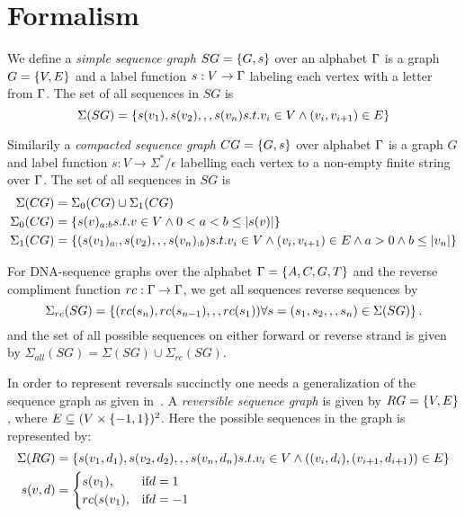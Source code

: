 \section{Formalism}
We define a \emph{simple sequence graph} $SG = \left\{G, s\right\}$ over an alphabet $\Gamma$ is a graph $G=\left\{V, E\right\}$ and a label function $s: V \rightarrow \Gamma$ labeling each vertex with a letter from $\Gamma$. The set of all sequences in $SG$ is 
$$\Sigma(SG) = \left\{s(v_1), s(v_2), , , s(v_n) s.t. v_i \in V \wedge (v_i, v_{i+1}) \in E\right\}$$

Similarily a \emph{compacted sequence graph} $CG = \left\{G, s\right\}$ over alphabet $\Gamma$ is a graph $G$ and label function $s: V \rightarrow \Sigma^* / \epsilon$ labelling each vertex to a non-empty finite string over $\Gamma$. The set of all sequences in $SG$ is
\begin{align*}
  \Sigma(CG) &= \Sigma_0(CG) \cup \Sigma_1(CG)\\
  \Sigma_0(CG) &=\left\{s(v)_{a:b} s.t. v \in V \wedge 0<a<b\leq\left|s(v)\right|\right\}\\
  \Sigma_1(CG) &= \left\{(s(v_1)_{a:}, s(v_2),,, s(v_n)_{:b}) s.t. v_i \in V \wedge (v_i, v_{i+1}) \in E \wedge a>0 \wedge b\leq \left|v_n\right|\right\}
\end{align*}

For DNA-sequence graphs over the alphabet $\Gamma=\left\{A, C, G, T\right\}$ and the reverse compliment function $rc: \Gamma \rightarrow \Gamma$, we get all sequences reverse sequences by
$$\Sigma_{rc}(SG) = \left\{(rc(s_n), rc(s_{n-1}), , , rc(s_1)) \forall s=(s_1, s_2,,,s_n) \in \Sigma(SG)\right\}.$$
and the set of all possible sequences on either forward or reverse strand is given by $\Sigma_{all}(SG) = \Sigma(SG) \cup \Sigma_{rc}(SG)$. 

In order to represent reversals succinctly one needs a generalization of the sequence graph as given in~\cite{vg}.
A \emph{reversible sequence graph} is given by $RG = \left\{V, E\right\}$, where $E \subseteq {(V \times \left\{-1, 1\right\})^2}$.
Here the possible sequences in the graph is represented by:
\begin{align*}
  \Sigma(RG) &= \left\{s(v_1, d_1), s(v_2, d_2), , , s(v_n, d_n) s.t. v_i \in V \wedge ((v_i, d_i), (v_{i+1}, d_{i+1})) \in E\right\}\\
  s(v, d) &=\begin{cases} s(v_1), & \text{if} d = 1\\
                        rc(s(v_1), & \text{if} d = -1\\
\end{cases}
\end{align*}
